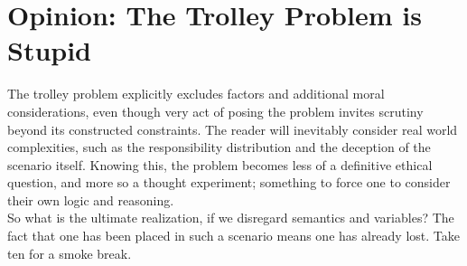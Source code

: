 \documentclass[12pt]{article}
\begin{document}
    \section{Opinion: The Trolley Problem is Stupid}
        The trolley problem explicitly excludes factors and additional moral considerations, 
        even though very act of posing the problem invites scrutiny beyond its constructed 
        constraints. The reader will inevitably consider real world complexities, 
        such as the responsibility distribution and the deception of the scenario itself. 
        Knowing this, the problem becomes less of a definitive ethical question, 
        and more so a thought experiment; something to force one to consider their 
        own logic and reasoning. \\ 

        So what is the ultimate realization, if we disregard semantics and
        variables? The fact that one has been placed in such a 
        scenario means one has already lost. Take ten for a smoke break. 
\end{document}
